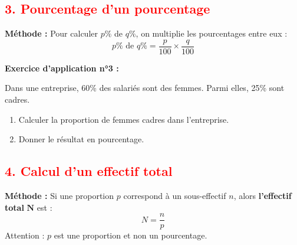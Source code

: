 \documentclass[12pt]{article}
\begin{document}
\vspace{10pt}


\subsection*{\textcolor{red}{3. Pourcentage d'un pourcentage}}

\vspace{5pt}

\begin{mdframed}[
    linewidth=1pt,
    roundcorner=5pt,
    linecolor=red
]
{\color{red}\textbf{Méthode :}}
Pour calculer $p\%$ de $q\%$, on multiplie les pourcentages entre eux :
\[
p\% \text{ de } q\% = \dfrac{p}{100} \times \dfrac{q}{100}
\]
\end{mdframed}

\vspace{5pt}

\begin{mdframed}[
    linewidth=1pt,
    roundcorner=5pt,
    linecolor=RoyalBlue
]
{\color{RoyalBlue}\textbf{Exercice d'application n°3 :}}
\vspace{5pt}

Dans une entreprise, 60\% des salariés sont des femmes.  
Parmi elles, 25\% sont cadres.
\begin{enumerate}
    \item Calculer la proportion de femmes cadres dans l'entreprise.
    \item Donner le résultat en pourcentage.
\end{enumerate}
\end{mdframed}

\vspace{10pt}


\subsection*{\textcolor{red}{4. Calcul d'un effectif total}}

\vspace{5pt}

\begin{mdframed}[
    linewidth=1pt,
    roundcorner=5pt,
    linecolor=red
]
{\color{red}\textbf{Méthode :}}
Si une proportion $p$ correspond à un sous-effectif $n$, alors \textbf{l'effectif total} $\bm{N}$ est :
\[
N = \dfrac{n}{p}
\]
{\color{red}Attention :} $p$ est une proportion et non un pourcentage.
\end{mdframed}
\end{document}
